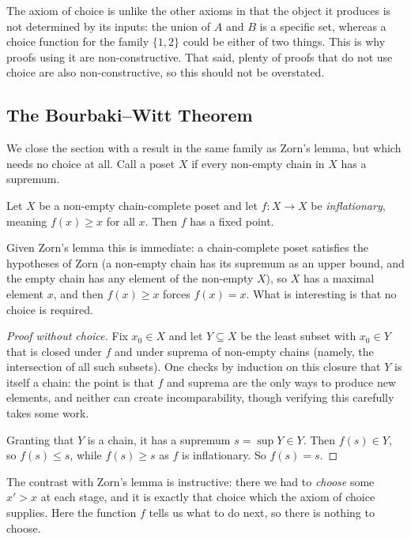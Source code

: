 The axiom of choice is unlike the other axioms in that the object it produces is not determined by its inputs: the union of $A$ and $B$ is a specific set, whereas a choice function for the family $\{1, 2\}$ could be either of two things. This is why proofs using it are non-constructive. That said, plenty of proofs that do not use choice are also non-constructive, so this should not be overstated.

\subsection{The Bourbaki--Witt Theorem}

We close the section with a result in the same family as Zorn's lemma, but which needs no choice at all. Call a poset $X$  if every non-empty chain in $X$ has a supremum.

\begin{theorem}
  Let $X$ be a non-empty chain-complete poset and let $f: X \to X$ be \emph{inflationary}, meaning $f(x) \geq x$ for all $x$. Then $f$ has a fixed point.
\end{theorem}

Given Zorn's lemma this is immediate: a chain-complete poset satisfies the hypotheses of Zorn (a non-empty chain has its supremum as an upper bound, and the empty chain has any element of the non-empty $X$), so $X$ has a maximal element $x$, and then $f(x) \geq x$ forces $f(x) = x$. What is interesting is that no choice is required.

\begin{proof}[Proof without choice]
  Fix $x_0 \in X$ and let $Y \subseteq X$ be the least subset with $x_0 \in Y$ that is closed under $f$ and under suprema of non-empty chains (namely, the intersection of all such subsets). One checks by induction on this closure that $Y$ is itself a chain: the point is that $f$ and suprema are the only ways to produce new elements, and neither can create incomparability, though verifying this carefully takes some work.

  Granting that $Y$ is a chain, it has a supremum $s = \sup Y \in Y$. Then $f(s) \in Y$, so $f(s) \leq s$, while $f(s) \geq s$ as $f$ is inflationary. So $f(s) = s$.
\end{proof}

The contrast with Zorn's lemma is instructive: there we had to \emph{choose} some $x' > x$ at each stage, and it is exactly that choice which the axiom of choice supplies. Here the function $f$ tells us what to do next, so there is nothing to choose.

